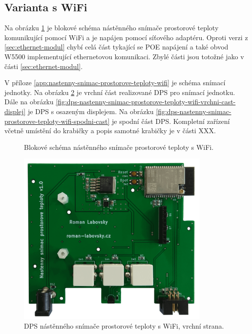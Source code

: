 \subsection{Varianta s WiFi}
\label{sec:wifi-modul}

Na obrázku \ref{fig:blokove-schema-nastenny-snimac-teploty-wifi} je blokové schéma nástěnného snímače prostorové teploty komunikující pomocí WiFi a je napájen pomocí síťového adaptéru. Oproti verzi z \ref{sec:ethernet-modul} chybí celá část tykající se POE napájení a také obvod W5500 implementující ethernetovou komunikaci. Zbylé části jsou totožné jako v části \ref{sec:ethernet-modul}.

V příloze \ref{app:nastenny-snimac-prostorove-teploty-wifi} je schéma snímací jednotky. Na obrázku \ref{fig:dps-nastenny-snimac-prostorove-teploty-wifi-vrchni-cast} je vrchní část realizované DPS pro snímací jednotku. Dále na obrázku \ref{fig:dps-nastenny-snimac-prostorove-teploty-wifi-vrchni-cast-displej} je DPS s osazeným displejem. Na obrázku \ref{fig:dps-nastenny-snimac-prostorove-teploty-wifi-spodni-cast} je spodní část DPS. Kompletní zařízení včetně umístění do krabičky a popis samotné krabičky je v části XXX.

\begin{figure}[H]
    \centering
    \def\svgwidth{\columnwidth}
    
    \caption[]{Blokové schéma nástěnného snímače prostorové teploty s WiFi.}
    \label{fig:blokove-schema-nastenny-snimac-teploty-wifi}
\end{figure}

\begin{figure}[H]
    \centering
    \includegraphics[width=0.85\textwidth]{images/nastenny-snimac-prostorove-teploty-wifi/dps-nastenny-snimac-prostorove-teploty-wifi-vrchni-cast.png}
    \caption{DPS nástěnného snímače prostorové teploty s WiFi, vrchní strana.}
    \label{fig:dps-nastenny-snimac-prostorove-teploty-wifi-vrchni-cast}
\end{figure}

